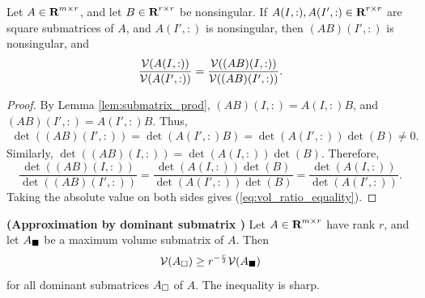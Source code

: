 \documentclass{article}
\begin{document}
	\begin{lem}
		\label{lem:submatrix_volume_and_matrix_multiplication}
		Let $A \in \textnormal{\bf R}^{m\times r}$, and let $B \in \textnormal{\bf R}^{r\times r}$ be nonsingular. If $A(I,:), A(I',:)\in \textnormal{\bf R}^{r\times r}$ are square submatrices of $A$, and $A(I',:)$ is nonsingular, then $(AB)(I',:)$ is nonsingular, and
		\begin{equation}
			\label{eq:vol_ratio_equality}
			\frac{\mathcal{V}(A(I,:))}{\mathcal{V}(A(I',:))} = \frac{\mathcal{V}((AB)(I,:))}{\mathcal{V}((AB)(I',:))}.
		\end{equation}
	\end{lem}
	
	\begin{proof} 
		By Lemma \ref{lem:submatrix_prod}, $(AB)(I,:) = A(I,:)B$, and $(AB)(I',:) = A(I',:)B$. Thus, 
		\begin{align}
			\det((AB)(I',:)) = \det(A(I',:)B) = \det(A(I',:))\det(B) \ne 0.
		\end{align}
		Similarly, $\det((AB)(I,:)) = \det(A(I,:))\det(B)$. Therefore,
		\begin{equation}
			\frac{\det((AB)(I,:))}{\det((AB)(I',:))} = \frac{\det(A(I,:))\det(B)}{\det(A(I',:))\det(B)} = \frac{\det(A(I,:))}{\det(A(I',:))}.
		\end{equation}
		Taking the absolute value on both sides gives (\ref{eq:vol_ratio_equality}).
	\end{proof}
	
	\begin{thm} \textnormal{\bf(Approximation by dominant submatrix \cite{goreinov_2010})}
		\label{thm:dominant_volume_bound}
		Let $A \in \textnormal{\bf R}^{m\times r}$ have rank $r$, and let $A_\blacksquare$ be a maximum volume submatrix of $A$. Then
		\begin{equation}
			\label{eq:dominant_volume_bound}
			\mathcal{V}(A_\square) \ge r^{-\frac{r}{2}}\mathcal{V}(A_\blacksquare)
		\end{equation}
		for all dominant submatrices $A_\square$ of $A$. The inequality is sharp.
	\end{thm}
	
\end{document}
